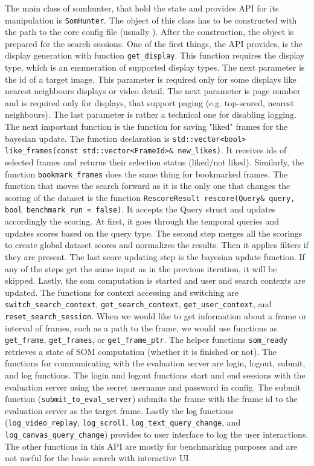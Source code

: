 The main class of somhunter, that hold the state and provides API for its manipulation is \lstinline{SomHunter}. The object of this class has to be constructed with the path to the core config file (usually ). After the construction, the object is prepared for the search sessions. One of the first things, the API provides, is the display generation with function \lstinline{get_display}. This function requires the display type, which is an enumeration of supported display types. The next parameter is the id of a target image. This parameter is required only for some displays like nearest neighbours displays or video detail. The next parameter is page number and is required only for displays, that support paging (e.g. top-scored, nearest neighbours). The last parameter is rather a technical one for disabling logging. The next important function is the function for saving "liked" frames for the bayesian update. The function declaration is \lstinline{std::vector<bool> like_frames(const std::vector<FrameId>& new_likes)}. It receives ids of selected frames and returns their selection status (liked/not liked). Similarly, the function \lstinline{bookmark_frames} does the same thing for bookmarked frames. The function that moves the search forward as it is the only one that changes the scoring of the dataset is the function \lstinline{RescoreResult rescore(Query& query, bool benchmark_run = false)}. It accepts the Query struct and updates accordingly the scoring. At first, it goes through the temporal queries and updates scores based on the query type. The second step merges all the scorings to create global dataset scores and normalizes the results. Then it applies filters if they are present. The last score updating step is the bayesian update function. If any of the steps get the same input as in the previous iteration, it will be skipped. Lastly, the som computation is started and user and search contexts are updated. The functions for context accessing and switching are \lstinline{switch_search_context}, \lstinline{get_search_context}, \lstinline{get_user_context}, and \lstinline{reset_search_session}. When we would like to get information about a frame or interval of frames, such as a path to the frame, we would use functions as \lstinline{get_frame}, \lstinline{get_frames}, or \lstinline{get_frame_ptr}. The helper functions \lstinline{som_ready} retrieves a state of SOM computation (whether it is finished or not). The functions for communicating with the evaluation server are login, logout, submit, and log functions. The login and logout functions start and end sessions with the evaluation server using the secret username and password in config. The submit function (\lstinline{submit_to_eval_server}) submits the frame with the frame id to the evaluation server as the target frame. Lastly the log functions (\lstinline{log_video_replay}, \lstinline{log_scroll}, \lstinline{log_text_query_change}, and \lstinline{log_canvas_query_change}) provides to user interface to log the user interactions. The other functions in this API are mostly for benchmarking purposes and are not useful for the basic search with interactive UI.


